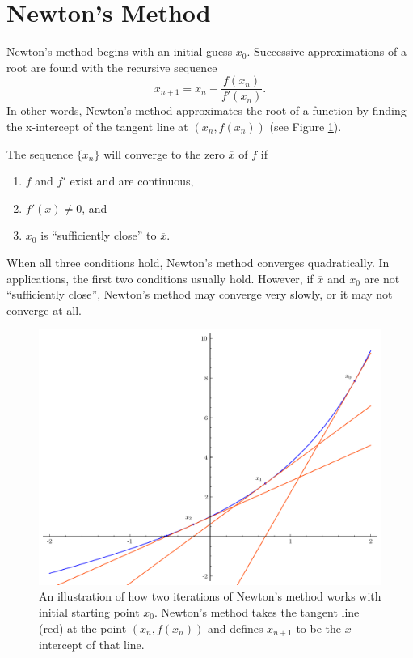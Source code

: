\label{lab:NewtonsMethod}

\section*{Newton's Method} %

Newton's method begins with an initial guess $x_0$.
Successive approximations of a root are found with the recursive sequence
\[
x_{n+1} = x_n - \frac{f(x_n)}{f'(x_n)}.
\]
In other words, Newton's method approximates the root of a function by finding the x-intercept of the tangent line at $(x_n, f(x_n))$ (see Figure \ref{fig:newton}).

The sequence $\{x_n\}$ will converge to the zero $\overline{x}$ of $f$ if
\begin{enumerate}
\item $f$ and $f'$ exist and are continuous,
\item $f'(\overline{x})\neq0$, and
\item $x_0$ is ``sufficiently close'' to $\overline{x}$.
\end{enumerate}
When all three conditions hold, Newton's method converges quadratically. In applications, the first two conditions usually hold. However, if $\overline{x}$ and $x_0$ are not ``sufficiently close'', Newton's method may converge very slowly, or it may not converge at all.

\begin{figure}[h]
\label{fig:newton}
\centering
\includegraphics[width=.7\textwidth]{figures/newton_iters.pdf}
\caption{An illustration of how two iterations of Newton's method works with initial starting point $x_0$. Newton's method takes the tangent line (red) at the point $(x_n, f(x_n))$ and defines $x_{n+1}$ to be the $x$-intercept of that line.}
\end{figure}

